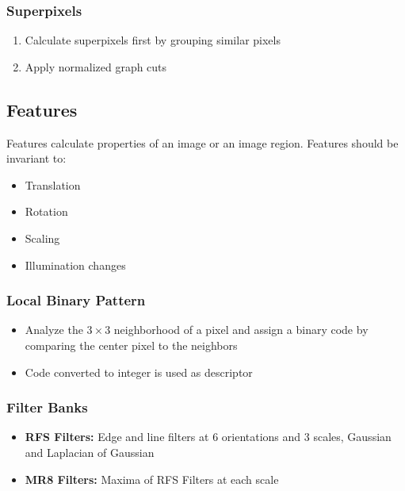 \begin{multicols}{2}
    \subsubsection{Superpixels}
    \begin{enumerate}
        \item Calculate superpixels first by grouping similar pixels
        \item Apply normalized graph cuts
    \end{enumerate}
\end{multicols}

\begin{multicols}{2}
    \subsection{Features}
    Features calculate properties of an image or an image region.
    Features should be invariant to:
    \begin{itemize}
        \item Translation
        \item Rotation
        \item Scaling
        \item Illumination changes
    \end{itemize}

    \subsubsection{Local Binary Pattern}
    \begin{itemize}
        \item Analyze the $3\times 3$ neighborhood of a pixel and assign a binary code by comparing the center pixel to the neighbors
        \item Code converted to integer is used as descriptor
    \end{itemize}

    \subsubsection{Filter Banks}
    \begin{itemize}
        \item \textbf{RFS Filters:} Edge and line filters at 6 orientations and 3 scales, Gaussian and Laplacian of Gaussian
        \item \textbf{MR8 Filters:} Maxima of RFS Filters at each scale
    \end{itemize}


\end{multicols}
